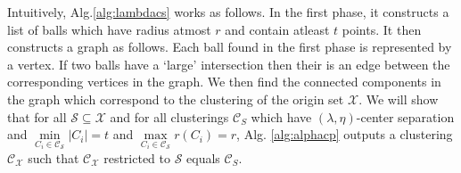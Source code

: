 \documentclass[anon,12pt]{colt2016} %
\newcommand{\mc}{\mathcal}
\begin{document}

Intuitively, Alg.\ref{alg:lambdacs} works as follows. In the first phase, it constructs a list of balls which have radius atmost $r$ and contain atleast $t$ points. It then constructs a graph as follows. Each ball found in the first phase is represented by a vertex. If two balls have a `large' intersection then their is an edge between the corresponding vertices in the graph. We then find the connected components in the graph which correspond to the clustering of the origin set $\mc X$. We will show that for all $\mc S \subseteq \mc X$ and for all clusterings $\mc C_S$ which have $(\lambda, \eta)$-center separation and $\min\limits_{C_i \in {\mc C}_{\mc S}} |C_i| = t$ and $\max\limits_{C_i \in {\mc C}_{\mc S}} r(C_i) = r$, Alg. \ref{alg:alphacp} outputs a clustering ${\mc C}_{\mc X}$ such that $\mc C_{\mc X}$ restricted to $\mc S$ equals $\mc C_S$. %
\end{document}
